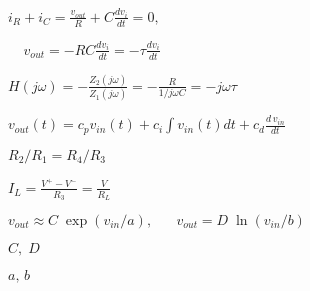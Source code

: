 \documentclass{article}
\def\lthtmlcheckvsize{\ifdim\ht\sizebox<\vsize 
  \ifdim\wd\sizebox<\hsize\expandafter\hfill\fi \expandafter\vfill
  \else\expandafter\vss\fi}%
\begin{document}
{\newpage\clearpage
{}%
$\displaystyle i_R+i_C=\frac{v_{out}}{R}+C\frac{d v_i}{dt}=0,\;\;\;\;$%
\lthtmlindisplaymathZ
\lthtmlcheckvsize\clearpage}

{\newpage\clearpage
{}%
$\displaystyle \;\;\;\;v_{out}=-RC \frac{d v_i}{dt}=-\tau \frac{d v_i}{dt}$%
\lthtmlindisplaymathZ
\lthtmlcheckvsize\clearpage}

{\newpage\clearpage
{}%
$\displaystyle H(j\omega)=-\frac{Z_2(j\omega)}{Z_1(j\omega)}=-\frac{R}{1/j\omega C}
=-j\omega \tau$%
\lthtmlindisplaymathZ
\lthtmlcheckvsize\clearpage}

{\newpage\clearpage
{}%
$\displaystyle v_{out}(t)=c_p v_{in}(t)+c_i \int v_{in}(t) dt +c_d\frac{d\,v_{in}}{dt}$%
\lthtmlindisplaymathZ
\lthtmlcheckvsize\clearpage}

{\newpage\clearpage
{}%
$ R_2/R_1=R_4/R_3$%
\lthtmlindisplaymathZ
\lthtmlcheckvsize\clearpage}

{\newpage\clearpage
{}%
$\displaystyle I_L=\frac{V^+-V^-}{R_3}=\frac{V}{R_L}$%
\lthtmlindisplaymathZ
\lthtmlcheckvsize\clearpage}

{\newpage\clearpage
{}%
$\displaystyle v_{out}\approx C \;\exp(v_{in}/a),\;\;\;\;\;\; v_{out}= D\; \ln (v_{in}/b)$%
\lthtmlindisplaymathZ
\lthtmlcheckvsize\clearpage}

{\newpage\clearpage
{}%
$ C,\;D$%
\lthtmlindisplaymathZ
\lthtmlcheckvsize\clearpage}

{\newpage\clearpage
{}%
$ a,\,b$%
\lthtmlindisplaymathZ
\lthtmlcheckvsize\clearpage}
\end{document}
